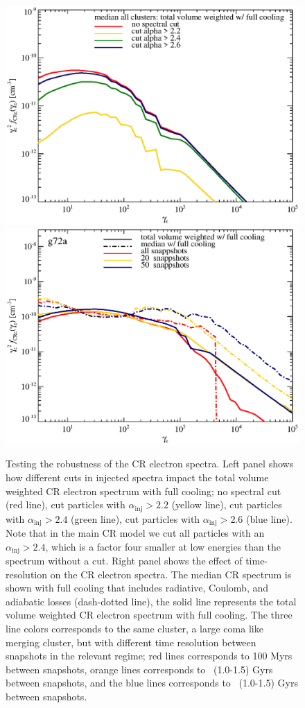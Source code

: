 \documentclass[useAMS,usenatbib]{mn2e}
\newcommand{\inj}{\mathrm{inj}}
\begin{document}
\begin{figure}
\begin{minipage}{2.0\columnwidth}
  \includegraphics[width=0.49\columnwidth]{./figures/CRspec.alphaCheck.eps}
  \includegraphics[width=0.49\columnwidth]{./figures/CRspec.snapCheck.eps}
  \caption{Testing the robustness of the CR electron spectra. Left
    panel shows how different cuts in injected spectra impact the
    total volume weighted CR electron spectrum with full cooling; no
    spectral cut (red line), cut particles with $\alpha_\inj>2.2$
    (yellow line), cut particles with $\alpha_\inj>2.4$ (green line),
    cut particles with $\alpha_\inj>2.6$ (blue line). Note that in the
    main CR model we cut all particles with an $\alpha_\inj>2.4$,
    which is a factor four smaller at low energies than the spectrum
    without a cut. Right panel shows the effect of time-resolution on
    the CR electron spectra. The median CR spectrum is shown with full
    cooling that includes radiative, Coulomb, and adiabatic losses
    (dash-dotted line), the solid line represents the total volume
    weighted CR electron spectrum with full cooling. The three line
    colors corresponds to the same cluster, a large coma like merging
    cluster, but with different time resolution between snapshots in
    the relevant regime; red lines corresponds to 100 Myrs between
    snapshots, orange lines corresponds to ~(1.0-1.5) Gyrs between
    snapshots, and the blue lines corresponds to ~(1.0-1.5) Gyrs
    between snapshots. \label{fig:e_spec_tests}}
\end{minipage}
\end{figure}
\end{document}
